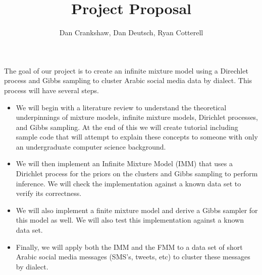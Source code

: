 \documentclass[11pt]{article}
\begin{document}
\title{Project Proposal}
\author{Dan Crankshaw, Dan Deutsch, Ryan Cotterell}

\maketitle

The goal of our project is to create an infinite mixture model using a Direchlet process
and Gibbs sampling to cluster Arabic social media data by dialect. This process will
have several steps.
\begin{itemize}
\item
We will begin with a literature review to understand the theoretical underpinnings
of mixture models, infinite mixture models, Dirichlet processes, and Gibbs sampling.
At the end of this we will create tutorial including sample code that will attempt
to explain these concepts to someone with only an undergraduate computer science
background.

\item We will then implement an Infinite Mixture Model (IMM) that uses a Dirichlet process
for the priors on the clusters and Gibbs sampling to perform inference. We will check
the implementation against a known data set to verify its correctness.

\item
We will also implement a finite mixture model and derive a Gibbs sampler for this model as well.
We will also test this implementation against a known data set.

\item
Finally, we will apply both the IMM and the FMM to a data set of short Arabic social media
messages (SMS's, tweets, etc) to cluster these messages by dialect.
\end{itemize}
\end{document}
